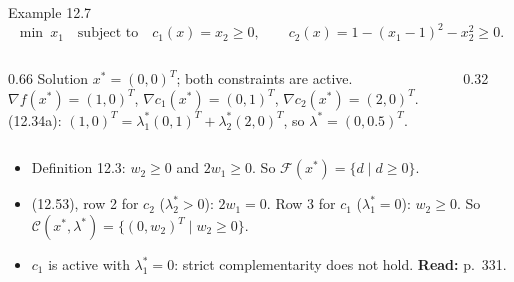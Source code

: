 \documentclass[aspectratio=169,12pt]{beamer}
\newcommand{\xs}{x^{*}}
\newcommand{\gradf}{\nabla f}
\newcommand{\readbook}[1]{{\color{red}\textbf{Read:} #1}}
\newcommand{\ls}{\lambda^{*}}
\newcommand{\cC}{\mathcal{C}}
\newcommand{\cF}{\mathcal{F}}
\begin{document}
\begin{frame}{Example 12.7}
  \[ \min\ x_{1}\quad\text{subject to}\quad c_{1}(x)=x_{2}\ge 0,\qquad c_{2}(x)=1-(x_{1}-1)^{2}-x_{2}^{2}\ge 0 . \tag{12.56} \]
  \begin{columns}[T,totalwidth=\textwidth]
    \begin{column}{0.66\textwidth}
      Solution $\xs=(0,0)^{T}$; both constraints are active.\\[0.2em]
      $\gradf(\xs)=(1,0)^{T}$, $\nabla c_{1}(\xs)=(0,1)^{T}$, $\nabla c_{2}(\xs)=(2,0)^{T}$.\\[0.2em]
      (12.34a): $(1,0)^{T}=\ls_{1}(0,1)^{T}+\ls_{2}(2,0)^{T}$, so $\ls=(0,0.5)^{T}$.
    \end{column}
    \begin{column}{0.32\textwidth}
      \centering
    \end{column}
  \end{columns}
  \begin{itemize}\setlength\itemsep{0.35em}
    \item Definition 12.3: $w_{2}\ge 0$ and $2w_{1}\ge 0$. So $\cF(\xs)=\{d\mid d\ge 0\}$.
    \item (12.53), row 2 for $c_{2}$ ($\ls_{2}>0$): $2w_{1}=0$. Row 3 for $c_{1}$ ($\ls_{1}=0$): $w_{2}\ge 0$. So
      $\cC(\xs,\ls)=\{(0,w_{2})^{T}\mid w_{2}\ge 0\}$.
    \item $c_{1}$ is active with $\ls_{1}=0$: strict complementarity does not hold. \readbook{p.~331.}
  \end{itemize}
\end{frame}
\end{document}
